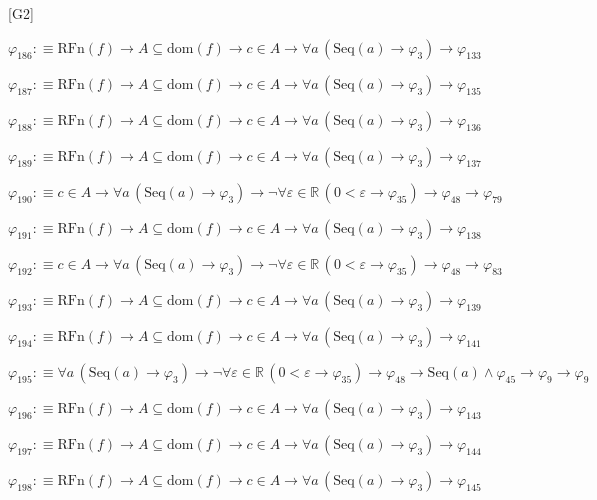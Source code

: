 \begin{fullproof}{[G2]}
\begin{abbrevlist}
\item $\varphi_{186} :\equiv \mathrm{RFn}(f) \to A \subseteq \mathrm{dom}(f) \to c \in A \to \forall a\,(\mathrm{Seq}(a) \to \varphi_{3}) \to \varphi_{133}$
\item $\varphi_{187} :\equiv \mathrm{RFn}(f) \to A \subseteq \mathrm{dom}(f) \to c \in A \to \forall a\,(\mathrm{Seq}(a) \to \varphi_{3}) \to \varphi_{135}$
\item $\varphi_{188} :\equiv \mathrm{RFn}(f) \to A \subseteq \mathrm{dom}(f) \to c \in A \to \forall a\,(\mathrm{Seq}(a) \to \varphi_{3}) \to \varphi_{136}$
\item $\varphi_{189} :\equiv \mathrm{RFn}(f) \to A \subseteq \mathrm{dom}(f) \to c \in A \to \forall a\,(\mathrm{Seq}(a) \to \varphi_{3}) \to \varphi_{137}$
\item $\varphi_{190} :\equiv c \in A \to \forall a\,(\mathrm{Seq}(a) \to \varphi_{3}) \to \neg \forall \varepsilon \in \mathbb{R}\,(0 < \varepsilon \to \varphi_{35}) \to \varphi_{48} \to \varphi_{79}$
\item $\varphi_{191} :\equiv \mathrm{RFn}(f) \to A \subseteq \mathrm{dom}(f) \to c \in A \to \forall a\,(\mathrm{Seq}(a) \to \varphi_{3}) \to \varphi_{138}$
\item $\varphi_{192} :\equiv c \in A \to \forall a\,(\mathrm{Seq}(a) \to \varphi_{3}) \to \neg \forall \varepsilon \in \mathbb{R}\,(0 < \varepsilon \to \varphi_{35}) \to \varphi_{48} \to \varphi_{83}$
\item $\varphi_{193} :\equiv \mathrm{RFn}(f) \to A \subseteq \mathrm{dom}(f) \to c \in A \to \forall a\,(\mathrm{Seq}(a) \to \varphi_{3}) \to \varphi_{139}$
\item $\varphi_{194} :\equiv \mathrm{RFn}(f) \to A \subseteq \mathrm{dom}(f) \to c \in A \to \forall a\,(\mathrm{Seq}(a) \to \varphi_{3}) \to \varphi_{141}$
\item $\varphi_{195} :\equiv \forall a\,(\mathrm{Seq}(a) \to \varphi_{3}) \to \neg \forall \varepsilon \in \mathbb{R}\,(0 < \varepsilon \to \varphi_{35}) \to \varphi_{48} \to \mathrm{Seq}(a) \land \varphi_{45} \to \varphi_{9} \to \varphi_{9}$
\item $\varphi_{196} :\equiv \mathrm{RFn}(f) \to A \subseteq \mathrm{dom}(f) \to c \in A \to \forall a\,(\mathrm{Seq}(a) \to \varphi_{3}) \to \varphi_{143}$
\item $\varphi_{197} :\equiv \mathrm{RFn}(f) \to A \subseteq \mathrm{dom}(f) \to c \in A \to \forall a\,(\mathrm{Seq}(a) \to \varphi_{3}) \to \varphi_{144}$
\item $\varphi_{198} :\equiv \mathrm{RFn}(f) \to A \subseteq \mathrm{dom}(f) \to c \in A \to \forall a\,(\mathrm{Seq}(a) \to \varphi_{3}) \to \varphi_{145}$

\end{abbrevlist}
\end{fullproof}
